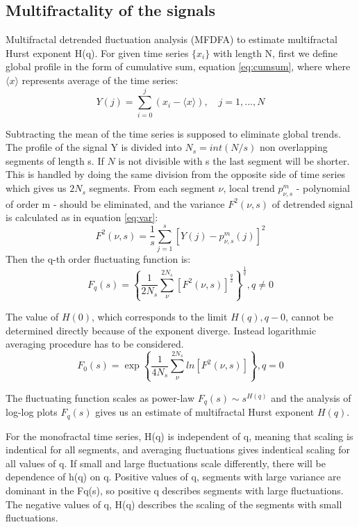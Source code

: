\subsection{Multifractality of the signals}

Multifractal detrended fluctuation analysis (MFDFA) \cite{kantelhardt2002, ihlen2012} to estimate multifractal Hurst exponent H(q). For given time series $\{x_i\}$ with length N, first we define global profile in the form of cumulative sum, equation \ref{eq:cumsum}, where where $\langle x\rangle $ represents average of the time series:
\begin{equation}
Y(j) = \sum_{i=0} ^j (x_i - \langle x\rangle), \quad j=1, ..., N
\label{eq:cumsum}
\end{equation}

Subtracting the mean of the time series is supposed to eliminate global trends. The profile of the signal Y is divided into $N_s = int (N/s)$ non overlapping segments of length s. If $N$ is not divisible with s the last segment will be shorter. This is handled by doing the same division from the opposite side of time series which gives us $2N_s$ segments. From each segment $\nu$, local trend $p^m_{\nu, s}$ - polynomial of order m - should be eliminated, and the variance $F^2(\nu, s)$ of detrended signal is calculated as in equation \ref{eq:var}:
\begin{equation}
F^2(\nu, s) = \frac{1}{s}\sum_{j=1}^s \left[Y(j) - p^m_{\nu, s}(j)\right]^2
\label{eq:var}
\end{equation}
Then the q-th order fluctuating function is: 
\begin{equation}
F_q(s) = \left\{\frac{1}{2N_s}\sum_{\nu}^{2N_s}\left[F^2(\nu, s)\right]^{\frac{q}{2}}\right\}^{\frac{1}{q}},  q \neq 0 \nonumber
\end{equation}

The value of $H(0)$, which corresponds to the limit $H(q), q-0$, cannot be determined directly because of the exponent diverge. Instead logarithmic averaging procedure has to be considered. 
\begin{equation}
F_0(s) = \exp \left\{\frac{1}{4N_s}\sum_{\nu}^{2N_s}ln \left[F^2(\nu, s)\right]\right\}, q=0
\end{equation}

The fluctuating function scales as power-law $F_q(s) \sim s^{H(q)}$ and the analysis of log-log plots $F_q(s)$ gives us an estimate of multifractal Hurst exponent $H(q)$.

For the monofractal time series, H(q) is independent of q, meaning that scaling is indentical for all segments, and averaging fluctuations gives indentical scaling for all values of q. If small and large fluctuations scale differently, there will be dependence of h(q) on q. Positive values of q, segments with large variance are dominant in the Fq(s), so positive q describes segments with large fluctuations. The negative values of q, H(q) describes the scaling of the segments with small fluctuations. 

